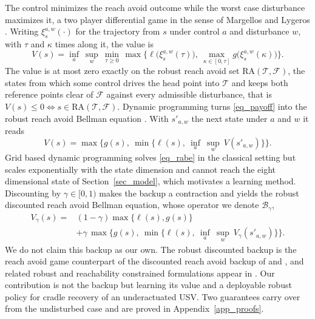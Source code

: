 \documentclass[5p,times,authoryear]{elsarticle}
\begin{document}
The control minimizes the reach avoid outcome while the worst case disturbance maximizes it, a two player differential game in the sense of Margellos and Lygeros \citep{margellos2011hamilton, fisac2015reach, hsu2021safety}. Writing $\xi^{a,w}_s(\cdot)$ for the trajectory from $s$ under control $a$ and disturbance $w$, with $\tau$ and $\kappa$ times along it, the value is
\begin{equation}\label{eq_payoff}
V(s) = \inf_{a}\ \sup_{w}\ \min_{\tau\ge 0}\, \max\Big\{ \ell\big(\xi^{a,w}_s(\tau)\big),\ \max_{\kappa\in[0,\tau]} g\big(\xi^{a,w}_s(\kappa)\big) \Big\}.
\end{equation}
The value is at most zero exactly on the robust reach avoid set $\mathrm{RA}(\mathcal{T},\mathcal{F})$, the states from which some control drives the head point into $\mathcal{T}$ and keeps both reference points clear of $\mathcal{F}$ against every admissible disturbance, that is $V(s)\le 0 \iff s\in\mathrm{RA}(\mathcal{T},\mathcal{F})$. Dynamic programming turns \eqref{eq_payoff} into the robust reach avoid Bellman equation \citep{hsu2021safety}. With $s'_{a,w}$ the next state under $a$ and $w$ it reads
\begin{equation}\label{eq_rabe}
V(s) = \max\Big\{ g(s),\ \min\big\{ \ell(s),\ \inf_{a}\ \sup_{w}\ V(s'_{a,w}) \big\} \Big\}.
\end{equation}
Grid based dynamic programming solves \eqref{eq_rabe} in the classical setting but scales exponentially with the state dimension and cannot reach the eight dimensional state of Section~\ref{sec_model}, which motivates a learning method. Discounting by $\gamma\in[0,1)$ makes the backup a contraction \citep{fisac2019bridging, hsu2021safety} and yields the robust discounted reach avoid Bellman equation, whose operator we denote $\mathcal{B}_\gamma$,
\begin{equation}\label{eq_drabe}
\begin{aligned}
V_\gamma(s) = {}& (1-\gamma)\max\{\ell(s), g(s)\} \\
&+ \gamma\,\max\Big\{ g(s),\ \min\big\{ \ell(s),\ \inf_{a}\ \sup_{w}\ V_\gamma(s'_{a,w}) \big\} \Big\}.
\end{aligned}
\end{equation}
We do not claim this backup as our own. The robust discounted backup is the reach avoid game counterpart of the discounted reach avoid backup of \citet{hsu2021safety} and \citet{fisac2019bridging}, and related robust and reachability constrained formulations appear in \citet{li2023robust, hsu2023isaacs, yu2022reachability}. Our contribution is not the backup but learning its value and a deployable robust policy for cradle recovery of an underactuated USV. Two guarantees carry over from the undisturbed case and are proved in Appendix~\ref{app_proofs}.
\end{document}
